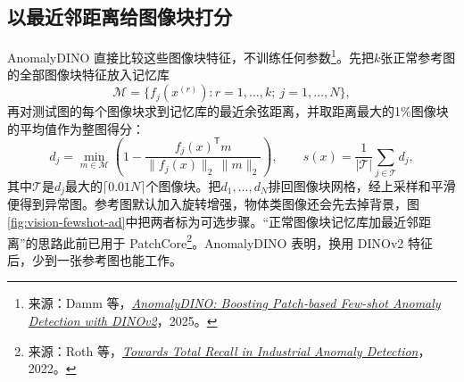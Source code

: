 \subsection{以最近邻距离给图像块打分}
AnomalyDINO 直接比较这些图像块特征，不训练任何参数\footnote{来源：Damm 等，\href{https://arxiv.org/abs/2405.14529}{\textit{AnomalyDINO: Boosting Patch-based Few-shot Anomaly Detection with DINOv2}}，2025。}。先把$k$张正常参考图的全部图像块特征放入记忆库
\begin{equation}
 \mathcal M=\{f_j(x^{(r)}):r=1,\ldots,k;\ j=1,\ldots,N\},
\end{equation}
再对测试图的每个图像块求到记忆库的最近余弦距离，并取距离最大的1\%图像块的平均值作为整图得分：
\begin{equation}
 d_j=\min_{m\in\mathcal M}\left(1-\frac{f_j(x)^{\mathsf T}m}{\|f_j(x)\|_2\,\|m\|_2}\right),\qquad
 s(x)=\frac1{|\mathcal T|}\sum_{j\in\mathcal T}d_j,
 \label{eq:vision-fewshot-score}
\end{equation}
其中$\mathcal T$是$d_j$最大的$\lceil0.01N\rceil$个图像块。把$d_1,\ldots,d_N$排回图像块网格，经上采样和平滑便得到异常图。参考图默认加入旋转增强，物体类图像还会先去掉背景，图\ref{fig:vision-fewshot-ad}中把两者标为可选步骤。“正常图像块记忆库加最近邻距离”的思路此前已用于 PatchCore\footnote{来源：Roth 等，\href{https://arxiv.org/abs/2106.08265}{\textit{Towards Total Recall in Industrial Anomaly Detection}}，2022。}。AnomalyDINO 表明，换用 DINOv2 特征后，少到一张参考图也能工作。

